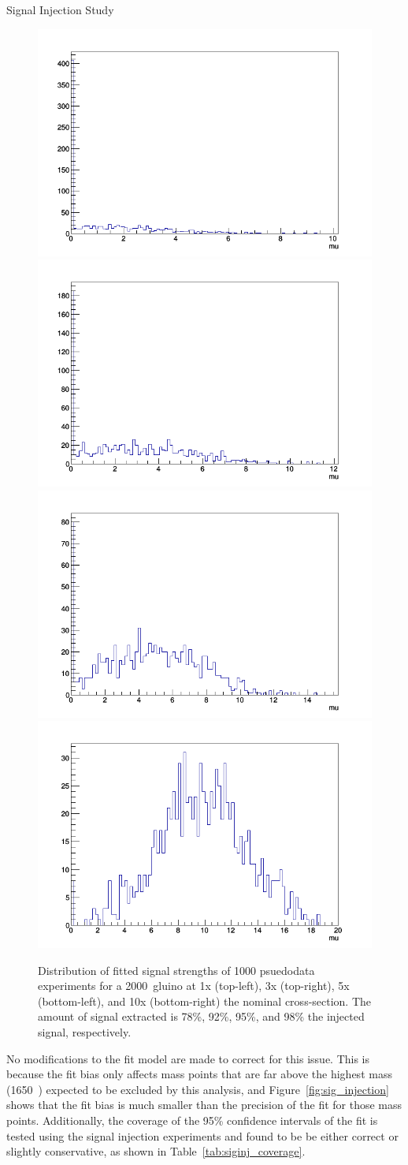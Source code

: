 \begin{subsection}{Signal Injection Study}
\begin{figure}[tbp!]
\centering
\includegraphics[angle=0,width=0.45\columnwidth]{fig/siginj_bias_1x.png}
\includegraphics[angle=0,width=0.45\columnwidth]{fig/siginj_bias_3x.png}
\includegraphics[angle=0,width=0.45\columnwidth]{fig/siginj_bias_5x.png}
\includegraphics[angle=0,width=0.45\columnwidth]{fig/siginj_bias_10x.png}
\caption{Distribution of fitted signal strengths of 1000 psuedodata experiments for a 2000~\GeV gluino at 1x (top-left), 3x (top-right), 5x (bottom-left), and 10x (bottom-right) the nominal cross-section.
The amount of signal extracted is 78\%, 92\%, 95\%, and 98\% the injected signal, respectively.}
\label{fig:siginj_bias_study}
\end{figure}

No modifications to the fit model are made to correct for this issue.
This is because the fit bias only affects mass points that are far above the highest mass (1650~\GeV) expected to be excluded by this analysis, and Figure~\ref{fig:sig_injection} shows that the fit bias is much smaller than the precision of the fit for those mass points.
Additionally, the coverage of the 95\% confidence intervals of the fit is tested using the signal injection experiments and found to be be either correct or slightly conservative, as shown in Table~\ref{tab:siginj_coverage}.


\end{subsection}
